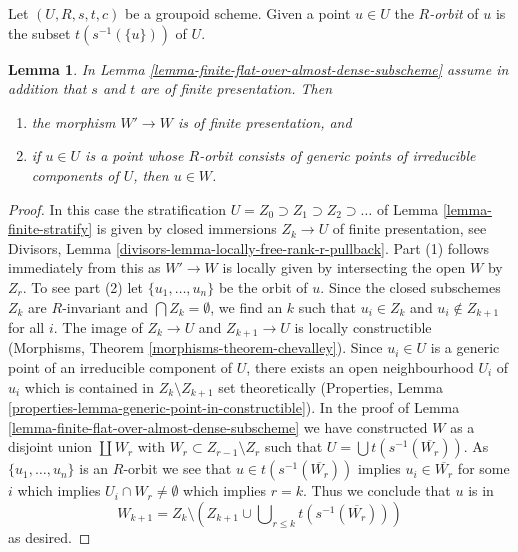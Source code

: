 \documentclass[10pt,a4paper]{amsart}
\theoremstyle{plain}
\newtheorem{lemma}[subsection]{Lemma}
\theoremstyle{definition}
\theoremstyle{remark}
\numberwithin{equation}{subsection}
\begin{document}
\noindent
Let $(U, R, s, t, c)$ be a groupoid scheme. Given a point $u \in U$
the {\it $R$-orbit} of $u$ is the subset $t(s^{-1}(\{u\}))$ of $U$.

\begin{lemma}
\label{lemma-finite-flat-over-almost-dense-subscheme-addendum}
In Lemma \ref{lemma-finite-flat-over-almost-dense-subscheme}
assume in addition that $s$ and $t$ are of finite presentation.
Then
\begin{enumerate}
\item the morphism $W' \to W$ is of finite presentation, and
\item if $u \in U$ is a point whose $R$-orbit consists of
generic points of irreducible components of $U$, then $u \in W$.
\end{enumerate}
\end{lemma}

\begin{proof}
In this case the stratification
$U = Z_0 \supset Z_1 \supset Z_2 \supset \ldots$ of
Lemma \ref{lemma-finite-stratify} is given by closed immersions $Z_k \to U$
of finite presentation, see
Divisors, Lemma \ref{divisors-lemma-locally-free-rank-r-pullback}.
Part (1) follows immediately from this as $W' \to W$ is locally given
by intersecting the open $W$ by $Z_r$. To see part (2)
let $\{u_1, \ldots, u_n\}$ be the orbit of $u$.
Since the closed subschemes $Z_k$ are $R$-invariant and
$\bigcap Z_k = \emptyset$, we find an $k$ such that $u_i \in Z_k$
and $u_i \not \in Z_{k + 1}$ for all $i$.
The image of $Z_k \to U$ and $Z_{k + 1} \to U$ is locally constructible
(Morphisms, Theorem \ref{morphisms-theorem-chevalley}).
Since $u_i \in U$ is a generic point of an irreducible component
of $U$, there exists an open neighbourhood $U_i$ of $u_i$ which
is contained in $Z_k \setminus Z_{k + 1}$ set theoretically
(Properties, Lemma \ref{properties-lemma-generic-point-in-constructible}).
In the proof of Lemma \ref{lemma-finite-flat-over-almost-dense-subscheme}
we have constructed $W$ as a disjoint union $\coprod W_r$
with $W_r \subset Z_{r - 1} \setminus Z_r$ such that
$U = \bigcup t(s^{-1}(\overline{W_r}))$. As $\{u_1, \ldots, u_n\}$
is an $R$-orbit we see that $u \in t(s^{-1}(\overline{W_r}))$
implies $u_i \in \overline{W_r}$ for some $i$ which implies
$U_i \cap W_r \not = \emptyset$ which implies $r = k$.
Thus we conclude that $u$ is in
$$
W_{k + 1} = Z_k \setminus
\left(
Z_{k + 1} \cup \bigcup\nolimits_{r \leq k} t(s^{-1}(\overline{W_r}))
\right)
$$
as desired.
\end{proof}
\end{document}
